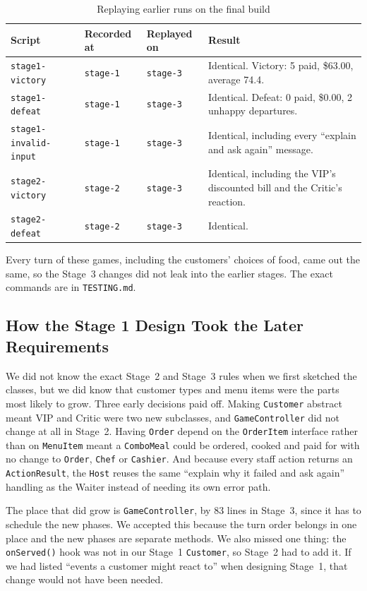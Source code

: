 \begin{table}[H]
\centering
\small
\begin{tabularx}{\textwidth}{l l l X}
\toprule
\textbf{Script} & \textbf{Recorded at} & \textbf{Replayed on} & \textbf{Result} \\
\midrule
\texttt{stage1-victory} & \texttt{stage-1} & \texttt{stage-3} & Identical. Victory: 5 paid, \$63.00, average 74.4. \\
\texttt{stage1-defeat} & \texttt{stage-1} & \texttt{stage-3} & Identical. Defeat: 0 paid, \$0.00, 2 unhappy departures. \\
\texttt{stage1-invalid-input} & \texttt{stage-1} & \texttt{stage-3} & Identical, including every ``explain and ask again'' message. \\
\texttt{stage2-victory} & \texttt{stage-2} & \texttt{stage-3} & Identical, including the VIP's discounted bill and the Critic's reaction. \\
\texttt{stage2-defeat} & \texttt{stage-2} & \texttt{stage-3} & Identical. \\
\bottomrule
\end{tabularx}
\caption{Replaying earlier runs on the final build}
\end{table}

Every turn of these games, including the customers' choices of food, came out the same, so the Stage~3 changes did
not leak into the earlier stages. The exact commands are in \texttt{TESTING.md}.

\subsection{How the Stage 1 Design Took the Later Requirements}

We did not know the exact Stage~2 and Stage~3 rules when we first sketched the classes, but we did know that
customer types and menu items were the parts most likely to grow. Three early decisions paid off.
Making \texttt{Customer} abstract meant VIP and Critic were two new subclasses, and \texttt{GameController} did not
change at all in Stage~2. Having \texttt{Order} depend on the \texttt{OrderItem} interface rather than on
\texttt{MenuItem} meant a \texttt{ComboMeal} could be ordered, cooked and paid for with no change to \texttt{Order},
\texttt{Chef} or \texttt{Cashier}. And because every staff action returns an \texttt{ActionResult}, the \texttt{Host}
reuses the same ``explain why it failed and ask again'' handling as the Waiter instead of needing its own error path.

The place that did grow is \texttt{GameController}, by 83 lines in Stage~3, since it has to schedule the new phases.
We accepted this because the turn order belongs in one place and the new phases are separate methods. We also missed
one thing: the \texttt{onServed()} hook was not in our Stage~1 \texttt{Customer}, so Stage~2 had to add it. If we had
listed ``events a customer might react to'' when designing Stage~1, that change would not have been needed.

\newpage
